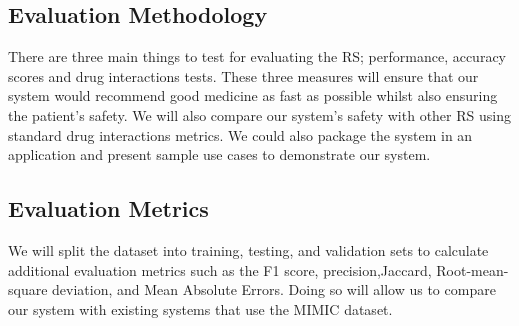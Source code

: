 \subsection{Evaluation Methodology}

There are three main things to test for evaluating the RS; performance,
accuracy scores and drug interactions tests. These three measures will
ensure that our system would recommend good medicine as fast as possible
whilst also ensuring the patient's safety. We will also compare our
system's safety with other RS using standard drug
interactions metrics. We could also package the system in
an application and present sample use cases to
demonstrate our system. 


\subsection{Evaluation Metrics}

We will split the dataset into training, testing, and validation sets
to calculate additional evaluation metrics such as the F1 score,
precision,Jaccard, Root-mean-square deviation, and Mean Absolute Errors. Doing so
will allow us to compare our system with existing systems that use the
MIMIC dataset. 

